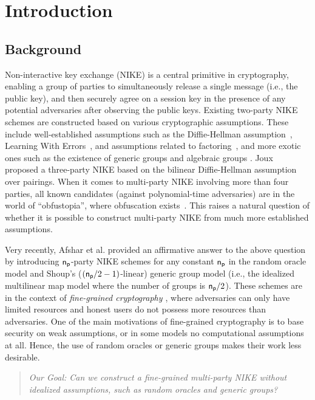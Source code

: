 \renewcommand{\heading}[1]{\vspace{1ex}\noindent{\bf #1}}
\section{Introduction}
\subsection{Background}
Non-interactive key exchange (NIKE) is a central primitive in cryptography, enabling a group of parties to simultaneously release a single message (i.e., the public key), and then securely agree on a session key in the presence of any potential adversaries after observing the public keys. Existing two-party NIKE schemes are constructed based on various cryptographic assumptions. These include well-established assumptions such as the Diffie-Hellman assumption~\cite{DH76}, Learning With Errors~\cite{GKRS22}, and assumptions related to factoring~\cite{PKC:FHKP13}, and more exotic ones such as the existence of generic groups \cite{EC:Shoup97,IMA:Maurer05} and algebraic groups \cite{C:FucKilLos18}. Joux~\cite{Joux04} proposed a three-party NIKE based on the bilinear Diffie-Hellman assumption over pairings. When it comes to multi-party NIKE involving more than four parties, all known candidates (against polynomial-time adversaries) are in the world of ``obfustopia'', where obfuscation exists~\cite{C:BonZha14}. This raises a natural question of whether it is possible to construct multi-party NIKE from much more established assumptions.

\heading{Multi-party NIKE based on mild assumptions.}
Very recently, Afshar et al. \cite{EC:ACMS23} provided an affirmative answer to the above question by introducing  $\mathsf{n_p}$-party NIKE schemes for any constant $\mathsf{n_p}$ in the random oracle model and Shoup's ($(\mathsf{n_p}/2-1)$-linear) generic group model (i.e., the idealized multilinear map model where the number of groups is $\mathsf{n_p}/2$). These schemes are in the context of \emph{fine-grained cryptography  \cite{C:DegVaiVas16}}, where adversaries can only have limited resources and honest users do not possess more resources than adversaries. One of the main motivations of fine-grained cryptography is to base security on weak assumptions, or in some models no computational assumptions at all. Hence, the use of random oracles or generic groups makes their work less desirable.

\begin{quote}
	\it 
	Our Goal: Can we construct a fine-grained multi-party NIKE without idealized assumptions, such as random oracles and generic groups?
\end{quote}


